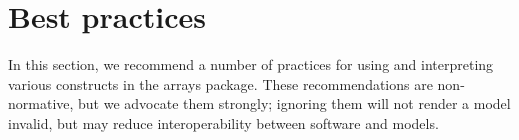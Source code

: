 
\section{Best practices}
\label{best-practices}

In this section, we recommend a number of practices for using and
interpreting various constructs in the arrays package.
These recommendations are non-normative, but we advocate them strongly;
ignoring them will not render a model invalid, but may reduce
interoperability between software and models.


